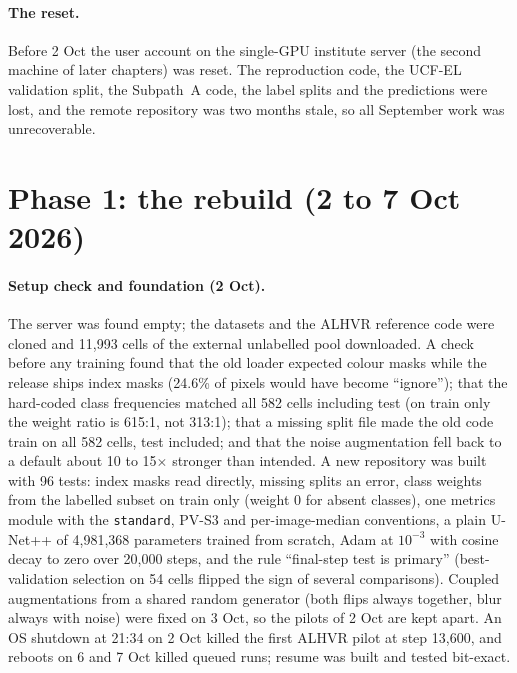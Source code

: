 \paragraph{The reset.} Before 2 Oct the user account on the single-GPU institute server (the second machine of later chapters) was
reset. The reproduction code, the UCF-EL validation split, the Subpath~A code, the label splits and the predictions were lost, and the
remote repository was two months stale, so all September work was unrecoverable.

\section{Phase 1: the rebuild (2 to 7 Oct 2026)}\label{sec:repro-phase1}

\paragraph{Setup check and foundation (2 Oct).} The server was found empty; the datasets and the ALHVR reference code were cloned and
11,993 cells of the external unlabelled pool downloaded. A check before any training found that the old loader expected colour masks
while the release ships index masks (24.6\% of pixels would have become ``ignore''); that the hard-coded class frequencies matched all
582 cells including test (on train only the weight ratio is 615:1, not 313:1); that a missing split file made the old code train on all
582 cells, test included; and that the noise augmentation fell back to a default about 10 to 15$\times$ stronger than intended. A new
repository was built with 96 tests: index masks read directly, missing splits an error, class weights from the labelled subset on train
only (weight 0 for absent classes), one metrics module with the \texttt{standard}, PV-S3 and per-image-median conventions, a plain
U-Net++ \citep{zhou2018unetpp} of 4,981,368 parameters trained from scratch, Adam at $10^{-3}$ with cosine decay to zero over 20,000
steps, and the rule ``final-step test is primary'' (best-validation selection on 54 cells flipped the sign of several comparisons).
Coupled augmentations from a shared random generator (both flips always together, blur always with noise) were fixed on 3 Oct, so the
pilots of 2 Oct are kept apart. An OS shutdown at 21:34 on 2 Oct killed the first ALHVR pilot at step 13,600, and reboots on 6 and 7
Oct killed queued runs; resume was built and tested bit-exact.

